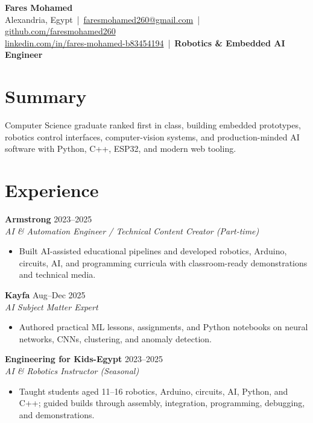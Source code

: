 \documentclass[letterpaper]{article}
\newcommand{\roleline}[3]{\textbf{#1} \hfill #2 \\\textit{#3} \\}
\begin{document}
\footnotesize
\begin{center}
{\LARGE \textbf{Fares Mohamed}}\\[3pt]
Alexandria, Egypt \,|\, \href{mailto:faresmohamed260@gmail.com}{faresmohamed260@gmail.com} \,|\, \href{https://github.com/faresmohamed260}{github.com/faresmohamed260}\\
\href{https://www.linkedin.com/in/fares-mohamed-b83454194/}{linkedin.com/in/fares-mohamed-b83454194} \,|\, \textbf{Robotics \& Embedded AI Engineer}
\end{center}

\section*{Summary}
Computer Science graduate ranked first in class, building embedded prototypes, robotics control interfaces, computer-vision systems, and production-minded AI software with Python, C++, ESP32, and modern web tooling.

\section*{Experience}
\roleline{Armstrong}{2023--2025}{AI \& Automation Engineer / Technical Content Creator (Part-time)}
\begin{itemize}
\item Built AI-assisted educational pipelines and developed robotics, Arduino, circuits, AI, and programming curricula with classroom-ready demonstrations and technical media.
\end{itemize}
\roleline{Kayfa}{Aug--Dec 2025}{AI Subject Matter Expert}
\begin{itemize}
\item Authored practical ML lessons, assignments, and Python notebooks on neural networks, CNNs, clustering, and anomaly detection.
\end{itemize}
\roleline{Engineering for Kids-Egypt}{2023--2025}{AI \& Robotics Instructor (Seasonal)}
\begin{itemize}
\item Taught students aged 11--16 robotics, Arduino, circuits, AI, Python, and C++; guided builds through assembly, integration, programming, debugging, and demonstrations.
\end{itemize}
\end{document}
